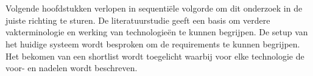 
\chapter{}%
\label{ch:methodologie}


Volgende hoofdstukken verlopen in sequentiële volgorde om dit onderzoek in de juiste richting te sturen.
De literatuurstudie geeft een basis om verdere vakterminologie en werking van technologieën te kunnen begrijpen.
De setup van het huidige systeem wordt besproken om de requirements te kunnen begrijpen.
Het bekomen van een shortlist wordt toegelicht waarbij voor elke technologie de voor- en nadelen wordt beschreven.


